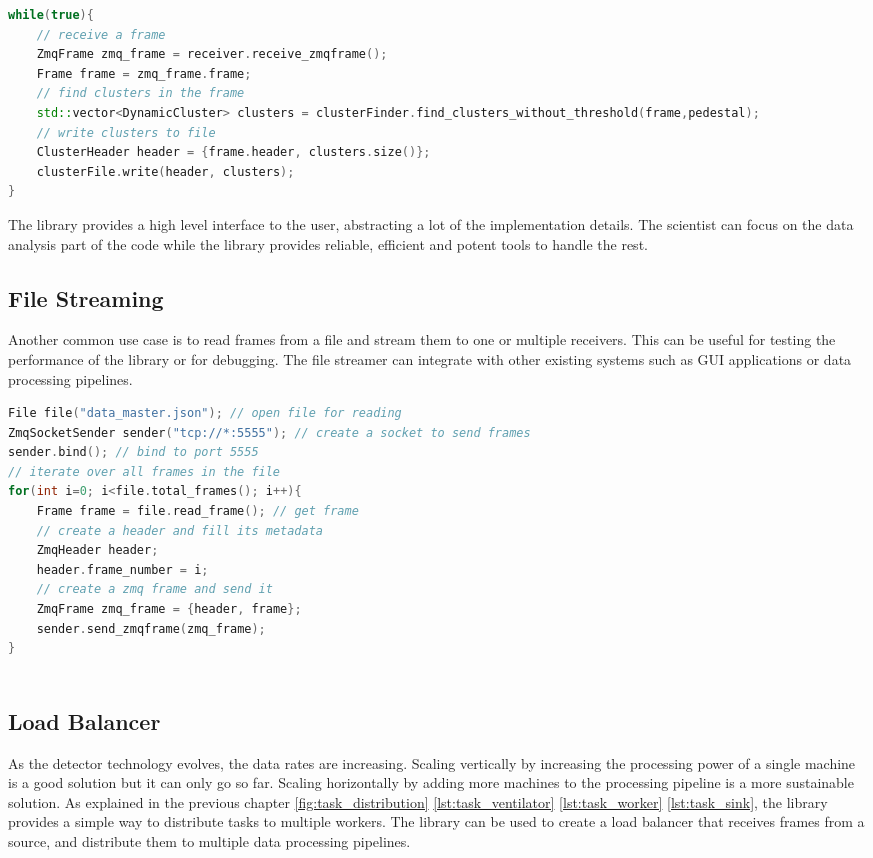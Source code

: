 \begin{spacing}{1.2}
\begin{lstlisting}[language=C++, caption=Example of a common use case ,label=lst:listen_analyze_store]
while(true){
    // receive a frame
    ZmqFrame zmq_frame = receiver.receive_zmqframe();
    Frame frame = zmq_frame.frame;
    // find clusters in the frame
    std::vector<DynamicCluster> clusters = clusterFinder.find_clusters_without_threshold(frame,pedestal);
    // write clusters to file
    ClusterHeader header = {frame.header, clusters.size()};
    clusterFile.write(header, clusters);
}    
\end{lstlisting}

    The library provides a high level interface to the user, abstracting a lot of the implementation
    details. The scientist can focus on the data analysis part of the code while the library
    provides reliable, efficient and potent tools to handle the rest.
    \subsection{File Streaming}
    Another common use case is to read frames from a file and stream them to one or multiple
    receivers. This can be useful for testing the performance of the library or for debugging.
    The file streamer can integrate with other existing systems such as GUI applications or
    data processing pipelines.
    \begin{lstlisting}[language=C++, caption=Example of file streaming ,label=lst:file_streaming]
File file("data_master.json"); // open file for reading
ZmqSocketSender sender("tcp://*:5555"); // create a socket to send frames
sender.bind(); // bind to port 5555
// iterate over all frames in the file
for(int i=0; i<file.total_frames(); i++){
    Frame frame = file.read_frame(); // get frame
    // create a header and fill its metadata
    ZmqHeader header;
    header.frame_number = i;
    // create a zmq frame and send it
    ZmqFrame zmq_frame = {header, frame};
    sender.send_zmqframe(zmq_frame);
}
        
    \end{lstlisting}

    \subsection{Load Balancer}
    As the detector technology evolves, the data rates are increasing. Scaling vertically
    by increasing the processing power of a single machine is a good solution but it can
    only go so far. Scaling horizontally by adding more machines to the processing pipeline
    is a more sustainable solution. As explained in the previous chapter
    \ref{fig:task_distribution} \ref{lst:task_ventilator} \ref{lst:task_worker} \ref{lst:task_sink},
    the library provides a simple way to distribute tasks to multiple workers.
    The library can be used to create a load balancer that receives frames from a source,
    and distribute them to multiple data processing pipelines.



\end{spacing}
